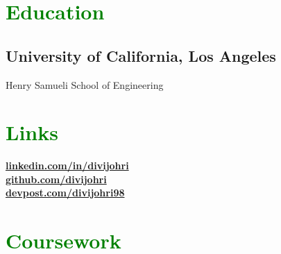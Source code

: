 \documentclass[letterpaper]{deedy-resume-openfont} %
\begin{document}
\begin{minipage}[t]{0.33\textwidth} %


\section{\textcolor{GREEN}{Education}} 

\subsection{University of California, \newline Los Angeles}

Henry Samueli School of Engineering\\

\sectionsep %


\section{\textcolor{GREEN}{Links}} 


\faLinkedin \hspace{.5mm} \href{https://www.linkedin.com/in/divijohri}{\bf linkedin.com/in/divijohri} \\
\faGithub \hspace{.5mm} \href{https://github.com/divijohri}{\bf github.com/divijohri} \\
\faUser \hspace{.5mm} \href{https://devpost.com/divijohri98}{\bf devpost.com/divijohri98} \\

\sectionsep %


\section{\textcolor{GREEN}{Coursework}}


\end{minipage}
\end{document}
